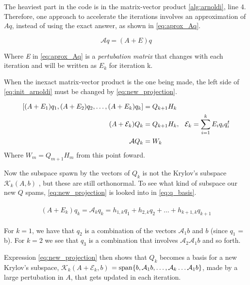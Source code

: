 The heaviest part in the code is in the matrix-vector product \ref{alg:arnoldi}, line 4. Therefore, one approach to accelerate the iterations involves an approximation of $Aq $, instead of using the exact answer, as shown in \ref{eq:aprox_Aq}.

\begin{equation}\label{eq:aprox_Aq}
    \mathcal{A}q = (A + E)q
\end{equation}

Where \textit{E} in \ref{eq:aprox_Aq} is a \textit{pertubation matrix} that changes with each iteration and will be written as $E_{k}$ for iteration k.

When the inexact matrix-vector product is the one being made, the left side of \ref{eq:init_arnoldi} must be changed by \ref{eq:new_projection}.


\begin{align} \label{eq:new_projection}
    \begin{split}
        [(A + E_{1})q_{1}, (A + E_{2})q_{2},\dots, (A + E_{k})q_{k}] &= Q_{k+1}H_{k}\\
        (A + \mathcal{E}_{k})Q_{k} &= Q_{k+1}H_{k}, \hspace{0.1in} \mathcal{E}_{k} = \sum_{i=1}^{k}E_{i}q_{i}q_{i}^{t}\\
        \mathcal{A}Q_{k} &= W_{k}
    \end{split}
\end{align}
Where $W_{m} = Q_{m+1}H_{m}$ from this point foward.

Now the subspace spawn by the vectors of $Q_{k}$ is not the Krylov's subspace $\mathcal{K}_{k}(A,b)$ , but these are still orthonormal.  To see what kind of subspace our new $Q$ spams, \ref{eq:new_projection} is looked into in \ref{eq:q_basis}.

\begin{align}\label{eq:q_basis}
    \begin{split}
        (A + E_{k})q_{k}=\mathcal{A}_{k} q_{k} = h_{1,k}q_{1} + h_{2,k}q_{2} + \dots + h_{k+1,k}q_{k+1}
    \end{split}
\end{align}

For $k=1$, we have that $q_{2}$ is a combination of the vectors $\mathcal{A}_{1}b$ and $b$ (since $q_{1}$ = b). For $k=2$ we see that $q_{3}$ is a combination that involves $\mathcal{A}_{2} \mathcal{A}_{1}b$ and so forth.

Expression \ref{eq:new_projection} then shows that $Q_{k}$ becomes a basis for a new Krylov's subspace, $\mathcal{K}_{k}(A+\mathcal{E}_{k},b)$ $= \operatorname{span} \{b,\mathcal{A}_{1}b,\dots, \mathcal{A}_{k}\dots\mathcal{A}_{1}b \}$, made by a large pertubation in $A$, that gets updated in each iteration.

